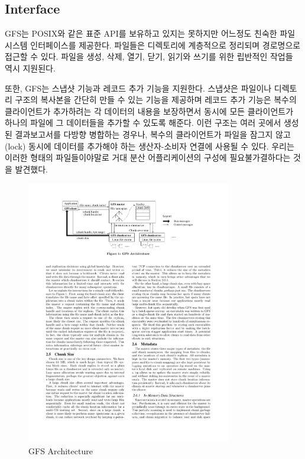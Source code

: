 \documentclass[twocolumn]{article}
\begin{document}
\subsection{Interface}

  GFS는  POSIX와 같은 표준 API를 보유하고 있지는 못하지만 어느정도 친숙한 파일 시스템 인터페이스를 제공한다.  파일들은 디렉토리에 계층적으로 정리되며 경로명으로 접근할 수 있다.  파일을 생성, 삭제, 열기, 닫기, 읽기와 쓰기를 위한 립반적인 작업들 역시 지원된다.

 또한, GFS는 스냅샷 기능과 레코드 추가 기능을 지원한다.  스냅샷은 파일이나 디렉토리 구조의 복사본을 간단히 만들 수 있는 기능을 제공하며 레코드 추가 기능은 복수의 클라이언트가 추가하려는 각 데이터의 내용을 보장하면서 동시에 모든 클라이언트가 하나의 파일에 그 데이터들을 추가할 수 있도록 해준다.  이런 구조는 여러 곳에서 생성된 결과보고서를 다방향 병합하는 경우나, 복수의 클라이언트가 파일을 잠그지 않고 (lock) 동시에 데이터를 추가해야 하는 생산자-소비자 연결에 사용될 수 있다.  우리는 이러한 형태의 파일들이야말로 거대 분산 어플리케이션의 구성에 필요불가결하다는 것을 발견했다.  

\begin{figure}[thb]
        \centering
        \includegraphics[width=0.8\textwidth]{architecture}
        \caption{GFS Architecture}
        \label{fig:architecture}
\end{figure}
\end{document}
